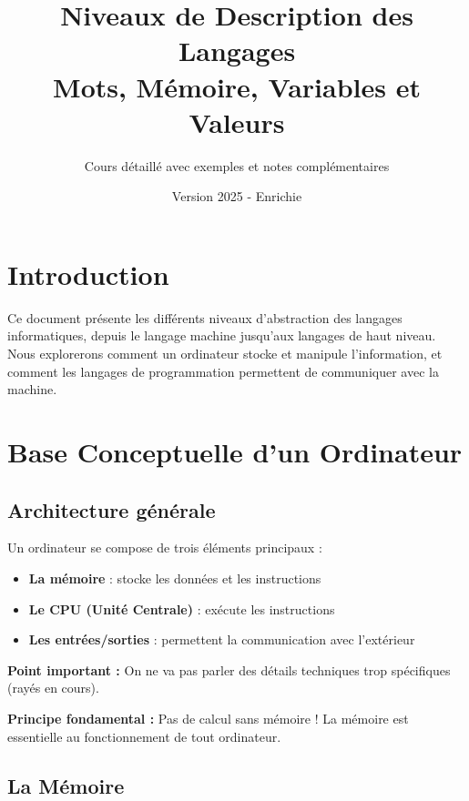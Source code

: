\documentclass[12pt,a4paper]{article}
\title{\textbf{\Huge\color{titrebleu}Niveaux de Description des Langages}\\[0.5em]
\large\color{defvert}Mots, Mémoire, Variables et Valeurs}
\author{\large Cours détaillé avec exemples et notes complémentaires}
\date{\large Version 2025 - Enrichie}
\begin{document}
\maketitle
\tableofcontents
\newpage

\section{Introduction}

Ce document présente les différents niveaux d'abstraction des langages informatiques, depuis le langage machine jusqu'aux langages de haut niveau. Nous explorerons comment un ordinateur stocke et manipule l'information, et comment les langages de programmation permettent de communiquer avec la machine.

\newpage
\section{Base Conceptuelle d'un Ordinateur}

\subsection{Architecture générale}

\begin{important}
Un ordinateur se compose de trois éléments principaux : 
\begin{itemize}
    \item \textcolor{titrebleu}{\textbf{La mémoire}} : stocke les données et les instructions
    \item \textcolor{defvert}{\textbf{Le CPU (Unité Centrale)}} : exécute les instructions
    \item \textcolor{exempleorange}{\textbf{Les entrées/sorties}} : permettent la communication avec l'extérieur
\end{itemize}
\end{important}

\begin{notecours}
\textbf{Point important : } On ne va pas parler des détails techniques trop spécifiques (rayés en cours).

\textbf{Principe fondamental :} Pas de calcul sans mémoire !  La mémoire est essentielle au fonctionnement de tout ordinateur.
\end{notecours}

\subsection{La Mémoire}
\end{document}
